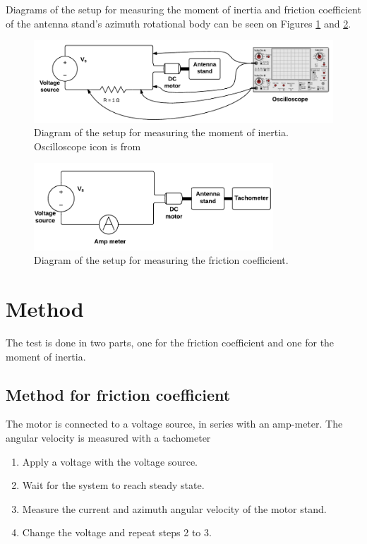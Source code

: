 Diagrams of the setup for measuring the moment of inertia and friction coefficient of the antenna stand's azimuth rotational body can be seen on Figures \ref{Appendix:fig:JsSetup} and \ref{Appendix:fig:BsSetup}.

\begin{figure} [!h]
    \centering
        \includegraphics[width=\textwidth]{figures/test/JsCircuit}
        \caption{Diagram of the setup for measuring the moment of inertia. Oscilloscope icon is from \cite{web:OscilloscopeIcon}}
        \label{Appendix:fig:JsSetup}
\end{figure}
\begin{figure} [!h]
    \centering
        \includegraphics[width=0.8\textwidth]{figures/test/BsCircuit}
        \caption{Diagram of the setup for measuring the friction coefficient.}
        \label{Appendix:fig:BsSetup}
\end{figure}

\section*{Method}
The test is done in two parts, one for the friction coefficient and one for the moment of inertia.
\subsection*{Method for friction coefficient}
The motor is connected to a voltage source, in series with an amp-meter. The angular velocity is measured with a tachometer
\begin{enumerate}
\item Apply a voltage with the voltage source.
\item Wait for the system to reach steady state.
\item Measure the current and azimuth angular velocity of the motor stand.
\item Change the voltage and repeat steps 2 to 3.
\end{enumerate}

